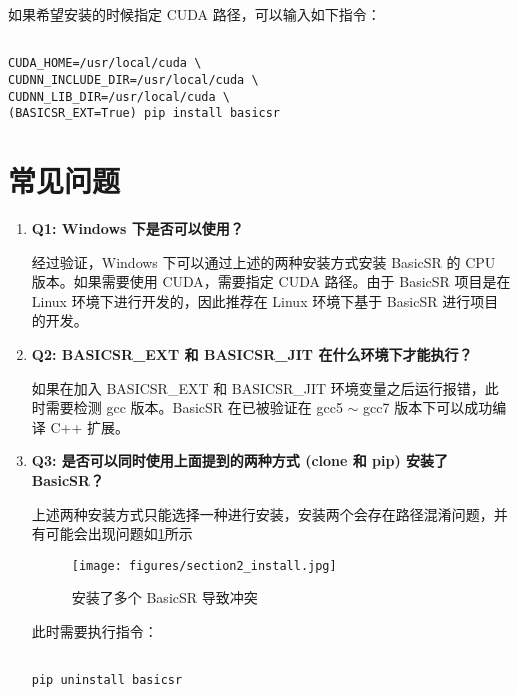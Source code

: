 \documentclass[../main.tex]{subfiles}
\begin{document}
如果希望安装的时候指定 CUDA 路径，可以输入如下指令：

\begin{verbatim}

CUDA_HOME=/usr/local/cuda \
CUDNN_INCLUDE_DIR=/usr/local/cuda \
CUDNN_LIB_DIR=/usr/local/cuda \
(BASICSR_EXT=True) pip install basicsr

\end{verbatim}




\section{常见问题}


\begin{enumerate}
    \item \textbf{Q1: Windows 下是否可以使用？}

    经过验证，Windows 下可以通过上述的两种安装方式安装 BasicSR 的 CPU 版本。如果需要使用 CUDA，需要指定 CUDA 路径。由于 BasicSR 项目是在 Linux 环境下进行开发的，因此推荐在 Linux 环境下基于 BasicSR 进行项目的开发。

    \item \textbf{Q2: BASICSR\_EXT 和 BASICSR\_JIT 在什么环境下才能执行？}

    如果在加入 BASICSR\_EXT 和 BASICSR\_JIT 环境变量之后运行报错，此时需要检测 gcc 版本。BasicSR 在已被验证在 gcc5 $\sim$ gcc7 版本下可以成功编译 C++ 扩展。

    \item \textbf{Q3: 是否可以同时使用上面提到的两种方式 (clone 和 pip) 安装了 BasicSR？}

    上述两种安装方式只能选择一种进行安装，安装两个会存在路径混淆问题，并有可能会出现问题如\ref{fig:install}所示

\begin{figure}[H]
	\begin{center}
		\texttt{[image: figures/section2\_install.jpg]}
		\caption{安装了多个 BasicSR 导致冲突}
		\label{fig:install}
	\end{center}
	\vspace{-0.5cm}
\end{figure}
    此时需要执行指令：
\begin{verbatim}

pip uninstall basicsr


\end{verbatim}
\end{enumerate}
\end{document}
